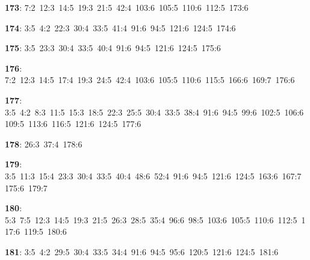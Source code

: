 \noindent \textbf{173}: 7:2\allowbreak\ 12:3\allowbreak\ 14:5\allowbreak\ 19:3\allowbreak\ 21:5\allowbreak\ 42:4\allowbreak\ 103:6\allowbreak\ 105:5\allowbreak\ 110:6\allowbreak\ 112:5\allowbreak\ 173:6\par
\noindent \textbf{174}: 3:5\allowbreak\ 4:2\allowbreak\ 22:3\allowbreak\ 30:4\allowbreak\ 33:5\allowbreak\ 41:4\allowbreak\ 91:6\allowbreak\ 94:5\allowbreak\ 121:6\allowbreak\ 124:5\allowbreak\ 174:6\par
\noindent \textbf{175}: 3:5\allowbreak\ 23:3\allowbreak\ 30:4\allowbreak\ 33:5\allowbreak\ 40:4\allowbreak\ 91:6\allowbreak\ 94:5\allowbreak\ 121:6\allowbreak\ 124:5\allowbreak\ 175:6\par
\noindent \textbf{176}: 7:2\allowbreak\ 12:3\allowbreak\ 14:5\allowbreak\ 17:4\allowbreak\ 19:3\allowbreak\ 24:5\allowbreak\ 42:4\allowbreak\ 103:6\allowbreak\ 105:5\allowbreak\ 110:6\allowbreak\ 115:5\allowbreak\ 166:6\allowbreak\ 169:7\allowbreak\ 176:6\par
\noindent \textbf{177}: 3:5\allowbreak\ 4:2\allowbreak\ 8:3\allowbreak\ 11:5\allowbreak\ 15:3\allowbreak\ 18:5\allowbreak\ 22:3\allowbreak\ 25:5\allowbreak\ 30:4\allowbreak\ 33:5\allowbreak\ 38:4\allowbreak\ 91:6\allowbreak\ 94:5\allowbreak\ 99:6\allowbreak\ 102:5\allowbreak\ 106:6\allowbreak\ 109:5\allowbreak\ 113:6\allowbreak\ 116:5\allowbreak\ 121:6\allowbreak\ 124:5\allowbreak\ 177:6\par
\noindent \textbf{178}: 26:3\allowbreak\ 37:4\allowbreak\ 178:6\par
\noindent \textbf{179}: 3:5\allowbreak\ 11:3\allowbreak\ 15:4\allowbreak\ 23:3\allowbreak\ 30:4\allowbreak\ 33:5\allowbreak\ 40:4\allowbreak\ 48:6\allowbreak\ 52:4\allowbreak\ 91:6\allowbreak\ 94:5\allowbreak\ 121:6\allowbreak\ 124:5\allowbreak\ 163:6\allowbreak\ 167:7\allowbreak\ 175:6\allowbreak\ 179:7\par
\noindent \textbf{180}: 5:3\allowbreak\ 7:5\allowbreak\ 12:3\allowbreak\ 14:5\allowbreak\ 19:3\allowbreak\ 21:5\allowbreak\ 26:3\allowbreak\ 28:5\allowbreak\ 35:4\allowbreak\ 96:6\allowbreak\ 98:5\allowbreak\ 103:6\allowbreak\ 105:5\allowbreak\ 110:6\allowbreak\ 112:5\allowbreak\ 117:6\allowbreak\ 119:5\allowbreak\ 180:6\par
\noindent \textbf{181}: 3:5\allowbreak\ 4:2\allowbreak\ 29:5\allowbreak\ 30:4\allowbreak\ 33:5\allowbreak\ 34:4\allowbreak\ 91:6\allowbreak\ 94:5\allowbreak\ 95:6\allowbreak\ 120:5\allowbreak\ 121:6\allowbreak\ 124:5\allowbreak\ 181:6\par
